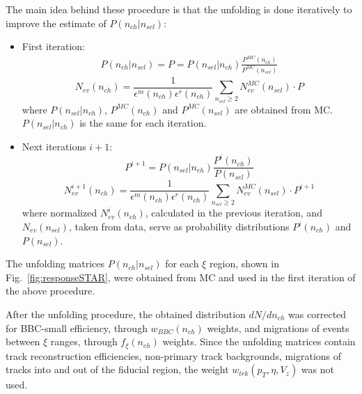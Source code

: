  The main idea behind these procedure is that the unfolding  is done iteratively to improve the estimate of $P(n_{ch}|n_{sel})$:
\begin{itemize}
	\item First iteration: \\
	\begin{eqnarray}
	P(n_{ch}|n_{sel}) = P = P(n_{sel}|n_{ch})\frac{P^{MC}(n_{ch})}{P^{MC}(n_{sel})}
	\end{eqnarray}
	\begin{equation}
	N_{ev}(n_{ch})=\frac{1}{\epsilon^{m}(n_{ch})\epsilon^{r}(n_{ch})}\sum_{n_{sel}\geq2}N_{ev}^{MC}(n_{sel})\cdot P
	\end{equation}
	where $P(n_{sel}|n_{ch})$, $P^{MC}(n_{ch})$ and $P^{MC}(n_{sel})$ are obtained from MC. $P(n_{sel}|n_{ch})$ is the same for each iteration.
	
	\item Next iterations $i+1$:
	\begin{equation}
	P^{i+1}=P(n_{sel}|n_{ch})\frac{P^{i}(n_{ch})}{P(n_{sel})}
	\end{equation}
	\begin{equation}
	N_{ev}^{i+1}(n_{ch})=\frac{1}{\epsilon^{m}(n_{ch})\epsilon^{r}(n_{ch})}\sum_{n_{sel}\geq2}N_{ev}^{MC}(n_{sel})\cdot P^{i+1}
	\end{equation}
	where normalized $N_{ev}^i(n_{ch})$, calculated in the previous iteration, and $N_{ev}(n_{sel})$, taken from data, serve as probability distributions $P^{i}(n_{ch})$ and $P(n_{sel})$.
\end{itemize}

The  unfolding matrices $P(n_{ch}|n_{sel})$  for each $\xi$ region, shown in Fig.~\ref{fig:responseSTAR}, were obtained from MC and used in the first iteration of the above procedure. 

After the unfolding procedure, the  obtained distribution $dN/dn_{ch}$
was corrected for BBC-small efficiency, through $w_{BBC}(n_{ch})$ weights, and migrations of events between $\xi$ ranges, through $f_{\xi}(n_{ch})$ weights. Since the unfolding matrices contain track reconstruction efficiencies, non-primary track backgrounds, migrations of tracks into and out of the fiducial region, the weight $w_{trk}\left(p_T,\eta,V_{z}\right)$ was not used.


